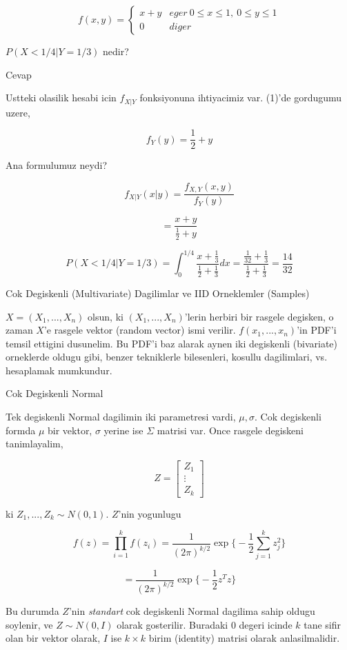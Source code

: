 \documentclass[12pt,fleqn]{article}\usepackage{../common}
\begin{document}
\[ f(x,y) = 
\left\{ \begin{array}{ll}
x+y & eger \ 0 \le x \le 1, \ 0 \le y \le 1 \\
0 & diger
\end{array} \right.
 \]

$P(X < 1/4 | Y = 1/3)$ nedir? 

Cevap 

Ustteki olasilik hesabi icin $f_{X|Y}$ fonksiyonuna ihtiyacimiz var. (1)'de
gordugumu uzere, 

\[ f_Y(y) = \frac{ 1}{2} + y 
 \]
 
Ana formulumuz neydi? 

\[ f_{X|Y}(x|y) = \frac{ f_{X,Y}(x,y)}{f_Y(y)} \]

\[ = 
\frac{ x+y }{\frac{ 1}{2} + y}
 \]


\[ P(X < 1/4 | Y = 1/3) = 
\int _{ 0}^{1/4} \frac{ x+ \frac{ 1}{3} }{\frac{ 1}{2} + \frac{1 }{3}} dx = 
\frac{ \frac{ 1}{32}+ \frac{ 1}{3} }{\frac{ 1}{2} + \frac{1 }{3}} = 
\frac{ 14}{32}
\]

Cok Degiskenli (Multivariate) Dagilimlar ve IID Orneklemler (Samples)

$X = (X_1,...,X_n)$ olsun, ki $(X_1,...,X_n)$'lerin herbiri bir rasgele
degisken, o zaman $X$'e rasgele vektor (random vector) ismi
verilir. $f(x_1,...,x_n)$'in PDF'i temsil ettigini dusunelim. Bu PDF'i baz
alarak aynen iki degiskenli (bivariate) orneklerde oldugu gibi, benzer
tekniklerle bilesenleri, kosullu dagilimlari, vs. hesaplamak mumkundur.

Cok Degiskenli Normal 

Tek degiskenli Normal dagilimin iki parametresi vardi, $\mu,\sigma$. Cok
degiskenli formda $\mu$ bir vektor, $\sigma$ yerine ise $\Sigma$ matrisi
var. Once rasgele degiskeni tanimlayalim,

\[ Z = 
\left[\begin{array}{r}
Z_1 \\ \vdots \\ Z_k
\end{array}\right]
 \]

ki $Z_1,...,Z_k \sim N(0,1)$. $Z$'nin yogunlugu 

\[ f(z) = \prod _{ i=1}^{k}f(z_i) = 
\frac{ 1}{(2\pi)^{k/2}} \exp 
\bigg\{ 
-\frac{ 1}{2}\sum _{ j=1}^{k}z_j^2
\bigg\}
 \]

\[ =
\frac{ 1}{(2\pi)^{k/2}} \exp 
\bigg\{ 
-\frac{ 1}{2}z^Tz
\bigg\}
 \]


Bu durumda $Z$'nin {\em standart} cok degiskenli Normal dagilima sahip
oldugu soylenir, ve $Z \sim N(0,I)$ olarak gosterilir. Buradaki $0$
degeri icinde $k$ tane sifir olan bir vektor olarak, $I$ ise $k \times k$
birim (identity) matrisi olarak anlasilmalidir. 
\end{document}
